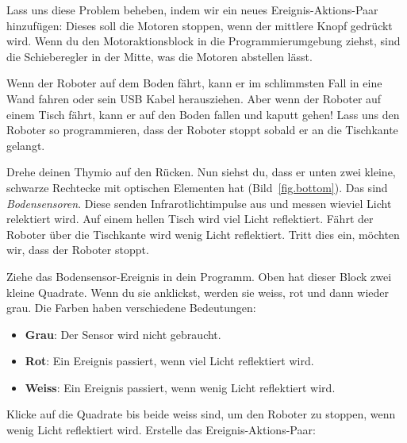 Lass uns diese Problem beheben, indem wir ein neues Ereignis-Aktions-Paar
hinzufügen: Dieses soll die Motoren stoppen, wenn der mittlere Knopf gedrückt wird. Wenn du den Motoraktionsblock in die Programmierumgebung ziehst, sind die Schieberegler in der Mitte, was die Motoren abstellen lässt.


Wenn der Roboter auf dem Boden fährt, kann er im schlimmsten Fall in eine Wand
fahren oder sein USB Kabel herausziehen. Aber wenn der Roboter auf einem Tisch
fährt, kann er auf den Boden fallen und kaputt gehen! Lass uns den Roboter so
programmieren, dass der Roboter stoppt sobald er an die Tischkante gelangt.


Drehe deinen Thymio auf den Rücken. Nun siehst du, dass er unten zwei
kleine, schwarze Rechtecke mit optischen Elementen hat (Bild~\ref{fig.bottom}).
Das sind \emph{Bodensensoren}. Diese senden Infrarotlichtimpulse aus und messen wieviel Licht relektiert wird. 
Auf einem hellen Tisch wird viel Licht reflektiert. Fährt der Roboter über die Tischkante wird wenig Licht reflektiert. Tritt dies ein, möchten wir, dass der Roboter stoppt.


Ziehe das Bodensensor-Ereignis  in dein Programm. Oben hat
dieser Block zwei kleine Quadrate. Wenn du sie anklickst, werden sie weiss, rot
und dann wieder grau. Die Farben haben verschiedene Bedeutungen:

\begin{itemize}
\item \textbf{Grau}: Der Sensor wird nicht gebraucht.
\item \textbf{Rot}: Ein Ereignis passiert, wenn viel Licht reflektiert wird.
\item \textbf{Weiss}: Ein Ereignis passiert, wenn wenig Licht reflektiert wird. 
\end{itemize}


Klicke auf die Quadrate bis beide weiss sind, um den Roboter zu stoppen, wenn
wenig Licht reflektiert wird. Erstelle das Ereignis-Aktions-Paar:

